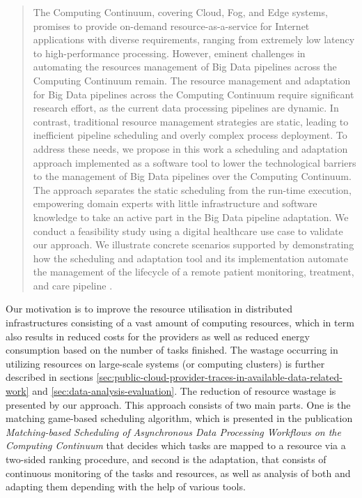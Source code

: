             \begin{quote}
                The Computing Continuum, covering Cloud, Fog, and Edge systems, promises to provide on-demand resource-as-a-service for Internet applications with diverse requirements, ranging from extremely low latency to high-performance processing. However, eminent challenges in automating the resources management of Big Data pipelines across the Computing Continuum remain. The resource management and adaptation for Big Data pipelines across the Computing Continuum require significant research effort, as the current data processing pipelines are dynamic. In contrast, traditional resource management strategies are static, leading to inefficient pipeline scheduling and overly complex process deployment. To address these needs, we propose in this work a scheduling and adaptation approach implemented as a software tool to lower the technological barriers to the management of Big Data pipelines over the Computing Continuum. The approach separates the static scheduling from the run-time execution, empowering domain experts with little infrastructure and software knowledge to take an active part in the Big Data pipeline adaptation. We conduct a feasibility study using a digital healthcare use case to validate our approach. We illustrate concrete scenarios supported by demonstrating how the scheduling and adaptation tool and its implementation automate the management of the lifecycle of a remote patient monitoring, treatment, and care pipeline \cite{kimovskiBigDataPipeline2022}.
            \end{quote}
            Our motivation is to improve the resource utilisation in distributed infrastructures consisting of a vast amount of computing resources, which in term also results in reduced costs for the providers as well as reduced energy consumption based on the number of tasks finished.
            The wastage occurring in utilizing resources on large-scale systems (or computing clusters) is further described in sections \ref{sec:public-cloud-provider-traces-in-available-data-related-work} and \ref{sec:data-analysis-evaluation}.
            The reduction of resource wastage is presented by our  approach. 
            This approach consists of two main parts. One is the matching game-based scheduling algorithm, which is presented in the publication \emph{Matching-based Scheduling of Asynchronous Data Processing Workflows on the Computing Continuum} \cite{mehranMatchingbasedSchedulingAsynchronous2022} that decides which tasks are mapped to a resource via a two-sided ranking procedure, and second is the adaptation, that consists of continuous monitoring of the tasks and resources, as well as analysis of both and adapting them depending with the help of various tools.

